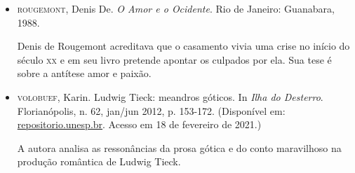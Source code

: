 \documentclass[12pt]{extarticle}
\begin{document}
\begin{itemize}
\item\textsc{rougemont}, Denis De. \textit{O Amor e o Ocidente}. Rio de Janeiro:
Guanabara, 1988.

Denis de Rougemont acreditava que o casamento vivia uma crise no início
do século \textsc{xx} e em seu livro pretende apontar os culpados por ela. Sua
tese é sobre a antítese amor e paixão.

\item\textsc{volobuef}, Karin. Ludwig Tieck: meandros góticos. In \emph{Ilha
do Desterro}. Florianópolis, n. 62, jan/jun 2012, p. 153-172.
(Disponível em:
\href{https://repositorio.unesp.br/bitstream/handle/11449/73913/2-s2.0-84872003268.pdf?sequence=1\&isAllowed=y}%
{repositorio.unesp.br}.
Acesso em 18 de fevereiro de 2021.)

A autora analisa as ressonâncias da prosa gótica e do conto maravilhoso
na produção romântica de Ludwig Tieck.
\end{itemize}
\end{document}
